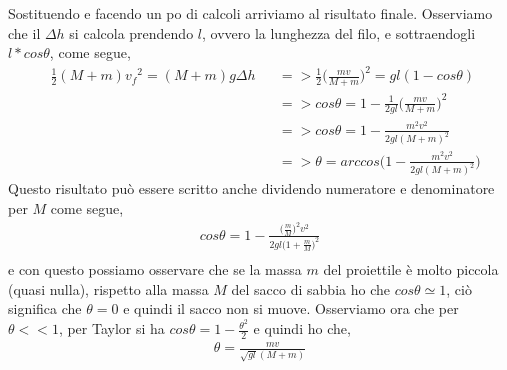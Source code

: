                 Sostituendo e facendo un po di calcoli arriviamo al risultato finale. Osserviamo che il $\Delta h$ si calcola prendendo $l$, ovvero la lunghezza del filo, e sottraendogli $l*cos\theta$, come segue,
                \begin{align*}
                    &\frac{1}{2}(M+m){v_f}^2 = (M+m)g\Delta h &&=>\frac{1}{2}\bigg(\frac{mv}{M+m}\bigg)^2=gl(1-cos\theta)\\
                    & &&=>cos\theta=1-\frac{1}{2gl}\bigg(\frac{mv}{M+m}\bigg)^2\\
                    & &&=>cos\theta=1-\frac{m^2v^2}{2gl(M+m)^2}\\
                    & &&=>\theta=arccos\bigg(1-\frac{m^2v^2}{2gl(M+m)^2}\bigg)
                \end{align*}
                Questo risultato può essere scritto anche dividendo numeratore e denominatore per $M$ come segue,
                \begin{align*}
                    cos\theta=1-\frac{\bigg(\frac{m}{M}\bigg)^2v^2}{2gl\bigg(1+\frac{m}{M}\bigg)^2}\\
                \end{align*}
                e con questo possiamo osservare che se la massa $m$ del proiettile è molto piccola (quasi nulla), rispetto alla massa $M$ del sacco di sabbia ho che $cos\theta\simeq1$, ciò significa che $\theta=0$ e quindi il sacco non si muove.
                Osserviamo ora che per $\theta<<1$, per Taylor si ha $cos\theta=1-\frac{\theta^2}{2}$ e quindi ho che,
                \begin{align*}
                    \theta=\frac{mv}{\sqrt{gl}(M+m)}
                \end{align*}


